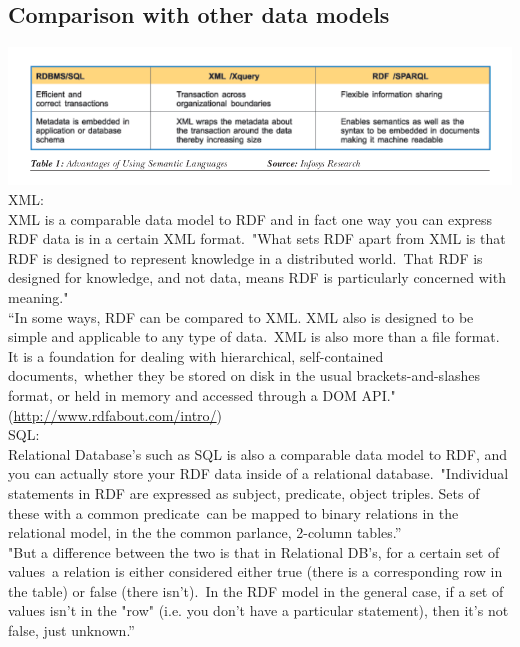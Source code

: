 \documentclass[DIV=calc, paper=a4, fontsize=12pt, onecolumn]{scrartcl}	 %
\begin{document}
\subsection{Comparison with other data models}

\includegraphics[scale=0.5]{sqlrdf.png}
 \citep{parachuri2008role}\\

XML:\\

XML is a comparable data model to RDF and in fact one way you can express RDF data is in a certain XML format.\
"What sets RDF apart from XML is that RDF is designed to represent knowledge in a distributed world.\
That RDF is designed for knowledge, and not data, means RDF is particularly concerned with meaning."\\

“In some ways, RDF can be compared to XML. XML also is designed to be simple and applicable to any type of data.\
XML is also more than a file format. It is a foundation for dealing with hierarchical, self-contained documents,\
 whether they be stored on disk in the usual brackets-and-slashes format, or held in memory and accessed through a DOM API."\\

 (\url{http://www.rdfabout.com/intro/})\\

SQL: \\

Relational Database’s such as SQL is also a comparable data model to RDF, and you can actually store your RDF data inside of a relational database.\
"Individual statements in RDF are expressed as subject, predicate, object triples. Sets of these with a common predicate\
 can be mapped to binary relations in the relational model, in the the common parlance, 2-column tables.”\\

"But a difference between the two is that in Relational DB's, for a certain set of values\
a relation is either considered either true (there is a corresponding row in the table) or false (there isn't).\
 In the RDF model in the general case, if a set of values isn't in the "row" (i.e. you don't have a particular statement), then it's not false, just unknown.”\\
\end{document}
